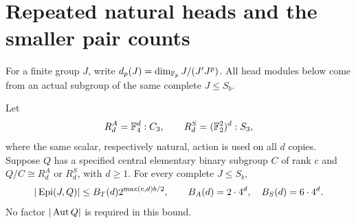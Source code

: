 \section{Repeated natural heads and the smaller pair counts}
\label{sec:small-pair-heads}
For a finite group $J$, write $d_p(J)=\dim_{\mathbb F_p}J/(J'J^p)$.
All head modules below come from an actual subgroup of the same complete
$J\leq S_b$.

\begin{proposition}
\label{prop:central-repeat}
Let
\[
 R_d^A=\mathbb F_4^d:C_3,\qquad
 R_d^S=(\mathbb F_2^2)^d:S_3,
\]
where the same scalar, respectively natural, action is used on all $d$
copies. Suppose $Q$ has a specified central elementary binary subgroup
$C$ of rank $c$ and $Q/C\cong R_d^A$ or $R_d^S$, with $d\geq1$.
For every complete $J\leq S_b$,
\[
 |\operatorname{Epi}(J,Q)|\leq B_T(d)2^{\max(c,d)b/2},
 \qquad B_A(d)=2\cdot4^d,\quad B_S(d)=6\cdot4^d.
\]
No factor $|\operatorname{Aut} Q|$ is required in this bound.
\end{proposition}

